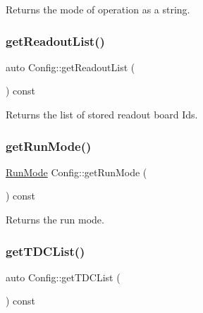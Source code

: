 Returns the mode of operation as a string. 

\mbox{\label{class_config_a2132b60dfeadd7627f2b91eeca972be6}} 
\subsubsection{\texorpdfstring{get\+Readout\+List()}{getReadoutList()}}
{\footnotesize\ttfamily auto Config\+::get\+Readout\+List (\begin{DoxyParamCaption}{ }\end{DoxyParamCaption}) const\hspace{0.3cm}{\ttfamily [inline]}}



Returns the list of stored readout board Ids. 

\mbox{\label{class_config_abae125b9691d912dcf6ca0351844f0b1}} 
\subsubsection{\texorpdfstring{get\+Run\+Mode()}{getRunMode()}}
{\footnotesize\ttfamily \hyperlink{_modes_enum_8hpp_a3dfe11cf1a3a8121f6cd7fec4bf5947e}{Run\+Mode} Config\+::get\+Run\+Mode (\begin{DoxyParamCaption}{ }\end{DoxyParamCaption}) const\hspace{0.3cm}{\ttfamily [inline]}}



Returns the run mode. 

\mbox{\label{class_config_a5abca15acd221de16fc625e7ed5dbb64}} 
\subsubsection{\texorpdfstring{get\+T\+D\+C\+List()}{getTDCList()}}
{\footnotesize\ttfamily auto Config\+::get\+T\+D\+C\+List (\begin{DoxyParamCaption}{ }\end{DoxyParamCaption}) const\hspace{0.3cm}{\ttfamily [inline]}}



